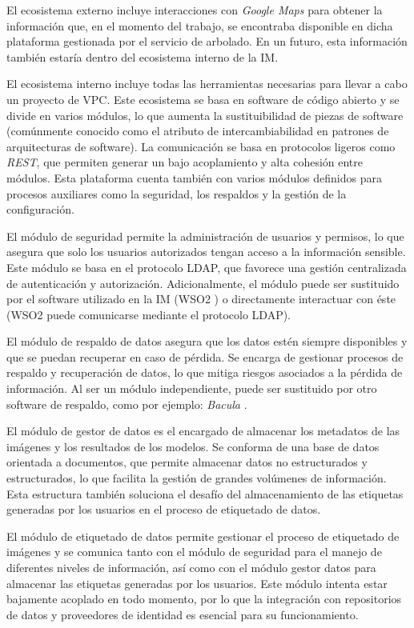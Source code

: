 El ecosistema externo incluye interacciones con \textit{Google Maps} para obtener la información que, en el momento del trabajo, se encontraba disponible en dicha plataforma gestionada por el servicio de arbolado. En un futuro, esta información también estaría dentro del ecosistema interno de la IM.

El ecosistema interno incluye todas las herramientas necesarias para llevar a cabo un proyecto de VPC. Este ecosistema se basa en software de código abierto y se divide en varios módulos, lo que aumenta la sustituibilidad de piezas de software (comúnmente conocido como el atributo de intercambiabilidad en patrones de arquitecturas de software). La comunicación se basa en protocolos ligeros como \textit{REST}, que permiten generar un bajo acoplamiento y alta cohesión entre módulos. Esta plataforma cuenta también con varios módulos definidos para procesos auxiliares como la seguridad, los respaldos y la gestión de la configuración.

El módulo de seguridad permite la administración de usuarios y permisos, lo que asegura que solo los usuarios autorizados tengan acceso a la información sensible. Este módulo se basa en el protocolo LDAP, que favorece una gestión centralizada de autenticación y autorización. Adicionalmente, el módulo puede ser sustituido por el software utilizado en la IM (WSO2 \citep{wso2_deliver_nodate}) o directamente interactuar con éste (WSO2 puede comunicarse mediante el protocolo LDAP).

El módulo de respaldo de datos asegura que los datos estén siempre disponibles y que se puedan recuperar en caso de pérdida. Se encarga de gestionar procesos de respaldo y recuperación de datos, lo que mitiga riesgos asociados a la pérdida de información. Al ser un módulo independiente, puede ser sustituido por otro software de respaldo, como por ejemplo: \textit{Bacula} \citep{bacula_documentation_nodate}.

El módulo de gestor de datos es el encargado de almacenar los metadatos de las imágenes y los resultados de los modelos. Se conforma de una base de datos orientada a documentos, que permite almacenar datos no estructurados y estructurados, lo que facilita la gestión de grandes volúmenes de información. Esta estructura también soluciona el desafío del almacenamiento de las etiquetas generadas por los usuarios en el proceso de etiquetado de datos.

El módulo de etiquetado de datos permite gestionar el proceso de etiquetado de imágenes y se comunica tanto con el módulo de seguridad para el manejo de diferentes niveles de información, así como con el módulo gestor datos para almacenar las etiquetas generadas por los usuarios. Este módulo intenta estar bajamente acoplado en todo momento, por lo que la integración con repositorios de datos y proveedores de identidad es esencial para su funcionamiento.

